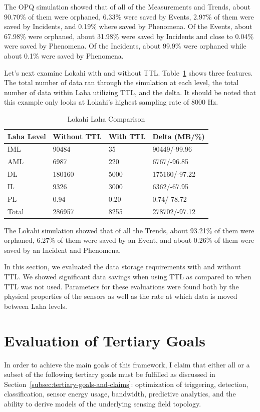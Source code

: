 The OPQ simulation showed that of all of the Measurements and Trends, about 90.70\% of them were orphaned, 6.33\% were saved by Events, 2.97\% of them were saved by Incidents, and 0.19\% where saved by Phenomena. Of the Events, about 67.98\% were orphaned, about 31.98\% were saved by Incidents and close to 0.04\% were saved by Phenomena. Of the Incidents, about 99.9\% were orphaned while about 0.1\% were saved by Phenomena.

Let's next examine Lokahi with and without TTL. Table~\ref{table:lokahi_laha_comparison} shows three features. The total number of data ran through the simulation at each level, the total number of data within Laha utilizing TTL, and the delta. It should be noted that this example only looks at Lokahi's highest sampling rate of 8000 Hz.

\begin{table}[H]
	\centering
	\caption{Lokahi Laha Comparison}
	\begin{tabularx}{\textwidth}{Xlll}
		\toprule
		\textbf{Laha Level} & \textbf{Without TTL} & \textbf{With TTL} & \textbf{Delta (MB/\%)} \\
		\midrule
		IML & 90484 & 35 & 90449/-99.96 \\
		AML & 6987 & 220 & 6767/-96.85 \\
		DL & 180160 & 5000 & 175160/-97.22 \\
		IL & 9326 & 3000 & 6362/-67.95 \\
		PL & 0.94 & 0.20 & 0.74/-78.72  \\
		Total & 286957 & 8255 & 278702/-97.12 \\
		\bottomrule
	\end{tabularx}
	\label{table:lokahi_laha_comparison}
\end{table}

The Lokahi simulation showed that of all the Trends, about 93.21\% of them were orphaned, 6.27\% of them were saved by an Event, and about 0.26\% of them were saved by an Incident and Phenomena.

In this section, we evaluated the data storage requirements with and without TTL. We showed significant data savings when using TTL as compared to when TTL was not used. Parameters for these evaluations were found both by the physical properties of the sensors as well as the rate at which data is moved between Laha levels.

\section{Evaluation of Tertiary Goals}\label{sec:evaluation-of-tertiary-goals}
In order to achieve the main goals of this framework, I claim that either all or a subset of the following tertiary goals must be fulfilled as discussed in Section~\ref{subsec:tertiary-goals-and-claims}: optimization of triggering, detection, classification, sensor energy usage, bandwidth, predictive analytics, and the ability to derive models of the underlying sensing field topology.

